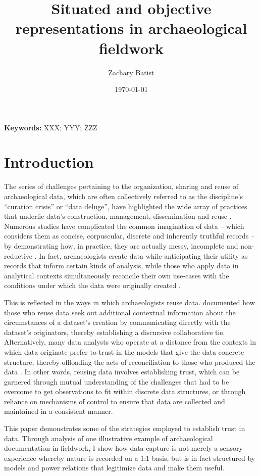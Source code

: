 \documentclass[12pt]{article}
\begin{document}
\title{Situated and objective representations in archaeological fieldwork}
\author{Zachary Batist}
\date{\today}
\maketitle

\begin{abstract}
\end{abstract}

\providecommand{\keywords}[1]{\textbf{{Keywords:}} #1}
\keywords{XXX; YYY; ZZZ}

\section*{Introduction}
The series of challenges pertaining to the organization, sharing and reuse of archaeological data, which are often collectively referred to as the discipline's ``curation crisis'' or ``data deluge'', have highlighted the wide array of practices that underlie data's construction, management, dissemination and reuse \parencites[]{bevan2012a}[]{huggett2022}[]{huggett2022a}.
Numerous studies have complicated the common imagination of data -- which considers them as concise, corpuscular, discrete and inherently truthful records -- by demonstrating how, in practice, they are actually messy, incomplete and non-reductive \parencites[cf.][]{huggett2022a}[]{voss2012}[]{dallas2015}[]{batist2024a}.
In fact, archaeologists create data while anticipating their utility as records that inform certain kinds of analysis, while those who apply data in analytical contexts simultaneously reconcile their own use-cases with the conditions under which the data were originally created \parencite[190-191]{dallas2015}.

This is reflected in the ways in which archaeologists reuse data.
\textcites[]{faniel2013}[]{atici2013} documented how those who reuse data seek out additional contextual information about the circumstances of a dataset's creation by communicating directly with the dataset's originators, thereby establishing a discursive collaborative tie.
Alternatively, many data analysts who operate at a distance from the contexts in which data originate prefer to trust in the models that give the data concrete structure, thereby offloading the acts of reconciliation to those who produced the data \parencites[]{huggett2022}.
In other words, reusing data involves establishing trust, which can be garnered through mutual understanding of the challenges that had to be overcome to get observations to fit within discrete data structures, or through reliance on mechanisms of control to ensure that data are collected and maintained in a consistent manner.

This paper demonstrates some of the strategies employed to establish trust in data.
Through analysis of one illustrative example of archaeological documentation in fieldwork, I show how data-capture is not merely a sensory experience whereby nature is recorded on a 1:1 basis, but is in fact structured by models and power relations that legitimize data and make them useful.
\end{document}
